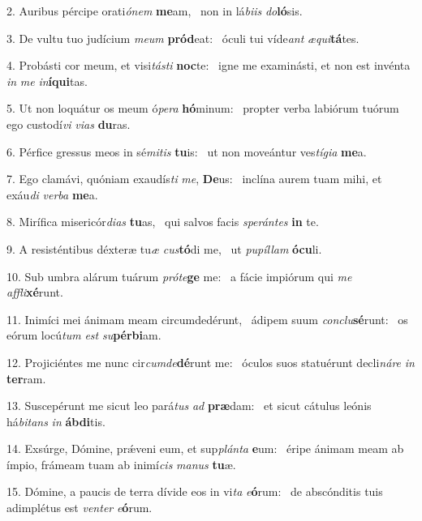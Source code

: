 2. Auribus pércipe orati\textit{ó}\textit{nem} \textbf{me}am, \ast\  non in lá\textit{bi}\textit{is} \textit{do}\textbf{ló}sis.\

3. De vultu tuo judícium \textit{me}\textit{um} \textbf{pród}eat: \ast\  óculi tui víde\textit{ant} \textit{æ}\textit{qui}\textbf{tá}tes.\

4. Probásti cor meum, et visi\textit{tás}\textit{ti} \textbf{noc}te: \ast\  igne me examinásti, et non est invénta \textit{in} \textit{me} \textit{in}\textbf{í}\textbf{qui}tas.\

5. Ut non loquátur os meum ó\textit{pe}\textit{ra} \textbf{hó}minum: \ast\  propter verba labiórum tuórum ego custodí\textit{vi} \textit{vi}\textit{as} \textbf{du}ras.\

6. Pérfice gressus meos in sé\textit{mi}\textit{tis} \textbf{tu}is: \ast\  ut non moveántur ves\textit{tí}\textit{gi}\textit{a} \textbf{me}a.\

7. Ego clamávi, quóniam exaudís\textit{ti} \textit{me}, \textbf{De}us: \ast\  inclína aurem tuam mihi, et exáu\textit{di} \textit{ver}\textit{ba} \textbf{me}a.\

8. Mirífica misericór\textit{di}\textit{as} \textbf{tu}as, \ast\  qui salvos facis \textit{spe}\textit{rán}\textit{tes} \textbf{in} te.\

9. A resisténtibus déxteræ tu\textit{æ} \textit{cus}\textbf{tó}di me, \ast\  ut \textit{pu}\textit{píl}\textit{lam} \textbf{ó}\textbf{cu}li.\

10. Sub umbra alárum tuárum \textit{pró}\textit{te}\textbf{ge} me: \ast\  a fácie impiórum qui \textit{me} \textit{af}\textit{fli}\textbf{xé}runt.\

11. Inimíci mei ánimam meam circumdedérunt, \dag\  ádipem suum \textit{con}\textit{clu}\textbf{sé}runt: \ast\  os eórum locú\textit{tum} \textit{est} \textit{su}\textbf{pér}\textbf{bi}am.\

12. Projiciéntes me nunc cir\textit{cum}\textit{de}\textbf{dé}runt me: \ast\  óculos suos statuérunt decli\textit{ná}\textit{re} \textit{in} \textbf{ter}ram.\

13. Suscepérunt me sicut leo pará\textit{tus} \textit{ad} \textbf{præ}dam: \ast\  et sicut cátulus leónis há\textit{bi}\textit{tans} \textit{in} \textbf{áb}\textbf{di}tis.\

14. Exsúrge, Dómine, prǽveni eum, et sup\textit{plán}\textit{ta} \textbf{e}um: \ast\  éripe ánimam meam ab ímpio, frámeam tuam ab inimí\textit{cis} \textit{ma}\textit{nus} \textbf{tu}æ.\

15. Dómine, a paucis de terra dívide eos in vi\textit{ta} \textit{e}\textbf{ó}rum: \ast\  de abscónditis tuis adimplétus est \textit{ven}\textit{ter} \textit{e}\textbf{ó}rum.\

